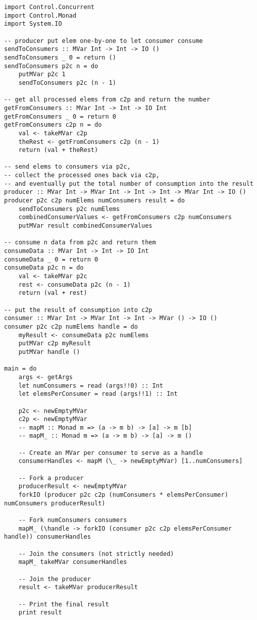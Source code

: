 \documentclass[twocolumn,landscape,10pt]{article}
\theoremstyle{definition}
\begin{document}
\begin{lstlisting}[Haskell]
import Control.Concurrent
import Control.Monad
import System.IO

-- producer put elem one-by-one to let consumer consume
sendToConsumers :: MVar Int -> Int -> IO ()
sendToConsumers _ 0 = return ()
sendToConsumers p2c n = do
    putMVar p2c 1
    sendToConsumers p2c (n - 1)

-- get all processed elems from c2p and return the number
getFromConsumers :: MVar Int -> Int -> IO Int
getFromConsumers _ 0 = return 0
getFromConsumers c2p n = do
    val <- takeMVar c2p
    theRest <- getFromConsumers c2p (n - 1)
    return (val + theRest)

-- send elems to consumers via p2c,
-- collect the processed ones back via c2p,
-- and eventually put the total number of consumption into the result
producer :: MVar Int -> MVar Int -> Int -> Int -> MVar Int -> IO ()
producer p2c c2p numElems numConsumers result = do
    sendToConsumers p2c numElems
    combinedConsumerValues <- getFromConsumers c2p numConsumers
    putMVar result combinedConsumerValues

-- consume n data from p2c and return them
consumeData :: MVar Int -> Int -> IO Int
consumeData _ 0 = return 0
consumeData p2c n = do
    val <- takeMVar p2c
    rest <- consumeData p2c (n - 1)
    return (val + rest)

-- put the result of consumption into c2p
consumer :: MVar Int -> MVar Int -> Int -> MVar () -> IO ()
consumer p2c c2p numElems handle = do
    myResult <- consumeData p2c numElems
    putMVar c2p myResult
    putMVar handle ()

main = do
    args <- getArgs
    let numConsumers = read (args!!0) :: Int
    let elemsPerConsumer = read (args!!1) :: Int

    p2c <- newEmptyMVar
    c2p <- newEmptyMVar
    -- mapM :: Monad m => (a -> m b) -> [a] -> m [b]
    -- mapM_ :: Monad m => (a -> m b) -> [a] -> m ()
    
    -- Create an MVar per consumer to serve as a handle
    consumerHandles <- mapM (\_ -> newEmptyMVar) [1..numConsumers]

    -- Fork a producer
    producerResult <- newEmptyMVar
    forkIO (producer p2c c2p (numConsumers * elemsPerConsumer) numConsumers producerResult)

    -- Fork numConsumers consumers
    mapM_ (\handle -> forkIO (consumer p2c c2p elemsPerConsumer handle)) consumerHandles

    -- Join the consumers (not strictly needed)
    mapM_ takeMVar consumerHandles

    -- Join the producer
    result <- takeMVar producerResult
    
    -- Print the final result
    print result
\end{lstlisting} 
\end{document}
